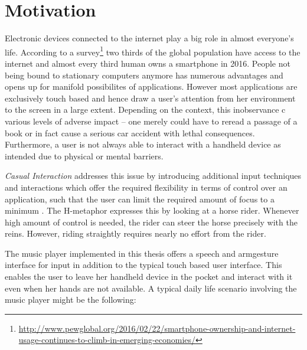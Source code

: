\chapter{Motivation}\label{ch:motivation}

Electronic devices connected to the internet play a big role in almost everyone's life. According to a survey\footnote{\url{http://www.pewglobal.org/2016/02/22/smartphone-ownership-and-internet-usage-continues-to-climb-in-emerging-economies/}} two thirds of the global population have access to the internet and almost every third human owns a smartphone in 2016. People not being bound to stationary computers anymore has numerous advantages and opens up for manifold possibilites of applications. However most applications are exclusively touch based and hence draw a user's attention from her environment to the screen in a large extent. Depending on the context, this inobservance c various levels of adverse impact -- one merely could have to reread a passage of a book or in fact cause a serious car accident with lethal consequences. Furthermore, a user is not always able to interact with a handheld device as intended due to physical or mental barriers.
 
\textit{Casual Interaction} addresses this issue by introducing additional input techniques and interactions which offer the required flexibility in terms of control over an application, such that the user can limit the required amount of focus to a minimum \cite{pohl2013focused}. The H-metaphor \cite{flemisch2003h} expresses this by looking at a horse rider. Whenever high amount of control is needed, the rider can steer the horse precisely with the reins. However, riding straightly requires nearly no effort from the rider. 

The music player implemented in this thesis offers a speech and armgesture interface for input in addition to the typical touch based user interface. This enables the user to leave her handheld device in the pocket and interact with it even when her hands are not available. A typical daily life scenario involving the music player might be the following:\\

